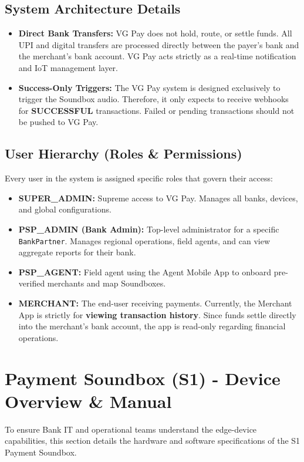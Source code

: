 \documentclass[11pt,a4paper]{article}
\begin{document}
\subsection{System Architecture Details}
\begin{itemize}
    \item \textbf{Direct Bank Transfers:} VG Pay does not hold, route, or settle funds. All UPI and digital transfers are processed directly between the payer's bank and the merchant's bank account. VG Pay acts strictly as a real-time notification and IoT management layer.
    \item \textbf{Success-Only Triggers:} The VG Pay system is designed exclusively to trigger the Soundbox audio. Therefore, it only expects to receive webhooks for \textbf{SUCCESSFUL} transactions. Failed or pending transactions should not be pushed to VG Pay.
\end{itemize}

\subsection{User Hierarchy (Roles \& Permissions)}
Every user in the system is assigned specific roles that govern their access:
\begin{itemize}
    \item \textbf{SUPER\_ADMIN:} Supreme access to VG Pay. Manages all banks, devices, and global configurations.
    \item \textbf{PSP\_ADMIN (Bank Admin):} Top-level administrator for a specific \texttt{BankPartner}. Manages regional operations, field agents, and can view aggregate reports for their bank.
    \item \textbf{PSP\_AGENT:} Field agent using the Agent Mobile App to onboard pre-verified merchants and map Soundboxes.
    \item \textbf{MERCHANT:} The end-user receiving payments. Currently, the Merchant App is strictly for \textbf{viewing transaction history}. Since funds settle directly into the merchant's bank account, the app is read-only regarding financial operations.
\end{itemize}

\newpage
\section{Payment Soundbox (S1) - Device Overview \& Manual}

To ensure Bank IT and operational teams understand the edge-device capabilities, this section details the hardware and software specifications of the S1 Payment Soundbox.
\end{document}
